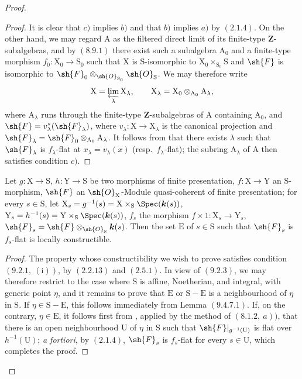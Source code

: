 \begin{proof}
\begin{proof}
It is clear that $c)$ implies $b)$ and that $b)$ implies $a)$ by
$(2.1.4)$. On the other hand, we may regard $\mathrm{A}$ as the filtered
direct limit of its finite-type $\mathbf{Z}$-subalgebras, and by $(8.9.1)$
there exist such a subalgebra $\mathrm{A}_0$ and a finite-type morphism
$f_0:\mathrm{X}_0\to\mathrm{S}_0$ such that $\mathrm{X}$ is
$\mathrm{S}$-isomorphic to
$\mathrm{X}_0\times_{\mathrm{S}_0}\mathrm{S}$ and $\sh{F}$ is isomorphic
to $\sh{F}_0\otimes_{\sh{O}_{\mathrm{S}_0}}\sh{O}_{\mathrm{S}}$. We may
therefore write
\[
  \mathrm{X}=\varprojlim_\lambda \mathrm{X}_\lambda,\qquad
  \mathrm{X}_\lambda=\mathrm{X}_0\otimes_{\mathrm{A}_0}\mathrm{A}_\lambda,
\]
where $\mathrm{A}_\lambda$ runs through the finite-type
$\mathbf{Z}$-subalgebras of $\mathrm{A}$ containing $\mathrm{A}_0$, and
$\sh{F}=v_\lambda^*(\sh{F}_\lambda)$, where
$v_\lambda:\mathrm{X}\to\mathrm{X}_\lambda$ is the canonical projection
and
$\sh{F}_\lambda=\sh{F}_0\otimes_{\mathrm{A}_0}\mathrm{A}_\lambda$. It
follows from  that there exists $\lambda$ such that
$\sh{F}_\lambda$ is $f_\lambda$-flat at
$x_\lambda=v_\lambda(x)$ (resp.\ $f_\lambda$-flat); the subring
$\mathrm{A}_\lambda$ of $\mathrm{A}$ then satisfies condition $c)$.
\end{proof}

\begin{proposition}[11.2.8]
\label{IV.11.2.8}
Let $g:\mathrm{X}\to\mathrm{S}$, $h:\mathrm{Y}\to\mathrm{S}$ be two morphisms of finite presentation, $f:\mathrm{X}\to\mathrm{Y}$ an S-morphism, $\sh{F}$ an $\sh{O}_\mathrm{X}$-Module quasi-coherent of finite presentation; for every $s\in\mathrm{S}$, let $\mathrm{X}_s=g^{-1}(s)=\mathrm{X}\times_\mathrm{S}\Spec(\boldsymbol{k}(s))$, $\mathrm{Y}_s=h^{-1}(s)=\mathrm{Y}\times_\mathrm{S}\Spec(\boldsymbol{k}(s))$, $f_s$ the morphism $f\times 1:\mathrm{X}_s\to\mathrm{Y}_s$, $\sh{F}_s=\sh{F}\otimes_{\sh{O}_\mathrm{S}}\boldsymbol{k}(s)$. Then the set $\mathrm{E}$ of $s\in\mathrm{S}$ such that $\sh{F}_s$ is $f_s$-flat is locally constructible.
\end{proposition}

\begin{proof}
The property whose constructibility we wish to prove satisfies condition
$(9.2.1,~(\mathrm{i}))$, by $(2.2.13)$ and $(2.5.1)$. In view of
$(9.2.3)$, we may therefore restrict to the case where $\mathrm{S}$ is
affine, Noetherian, and integral, with generic point $\eta$, and it remains
to prove that $\mathrm{E}$ or $\mathrm{S}-\mathrm{E}$ is a neighbourhood
of $\eta$ in $\mathrm{S}$. If
$\eta\in\mathrm{S}-\mathrm{E}$, this follows immediately from Lemma
$(9.4.7.1)$. If, on the contrary, $\eta\in\mathrm{E}$, it follows first
from , applied by the method of $(8.1.2,~a))$, that there
is an open neighbourhood $\mathrm{U}$ of $\eta$ in $\mathrm{S}$ such that
$\sh{F}|_{g^{-1}(\mathrm{U})}$ is flat over $h^{-1}(\mathrm{U})$; \emph{a
fortiori}, by $(2.1.4)$, $\sh{F}_s$ is $f_s$-flat for every
$s\in\mathrm{U}$, which completes the proof.
\end{proof}


\end{proof}
